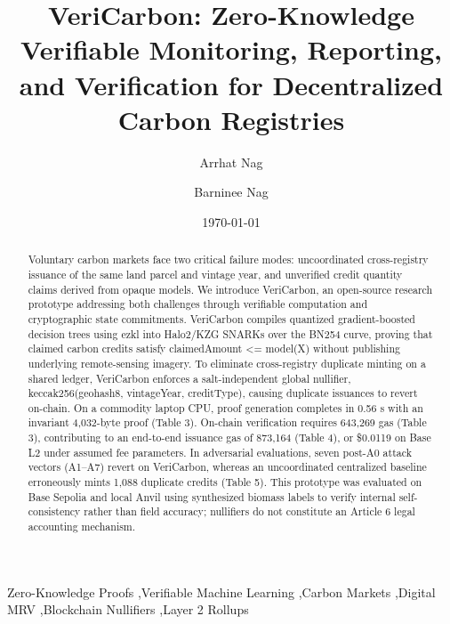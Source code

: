 \documentclass[preprint,12pt]{elsarticle}
\date{\today}
\begin{document}
\begin{frontmatter}

\title{VeriCarbon: Zero-Knowledge Verifiable Monitoring, Reporting, and Verification for Decentralized Carbon Registries}

\author[inst1]{Arrhat Nag}

\author[inst2]{Barninee Nag}

\begin{abstract}
Voluntary carbon markets face two critical failure modes: uncoordinated cross-registry issuance of the same land parcel and vintage year, and unverified credit quantity claims derived from opaque models. We introduce VeriCarbon, an open-source research prototype addressing both challenges through verifiable computation and cryptographic state commitments. VeriCarbon compiles quantized gradient-boosted decision trees using ezkl into Halo2/KZG SNARKs over the BN254 curve, proving that claimed carbon credits satisfy claimedAmount <= model(X) without publishing underlying remote-sensing imagery. To eliminate cross-registry duplicate minting on a shared ledger, VeriCarbon enforces a salt-independent global nullifier, keccak256(geohash8, vintageYear, creditType), causing duplicate issuances to revert on-chain. On a commodity laptop CPU, proof generation completes in 0.56 s with an invariant 4,032-byte proof (Table 3). On-chain verification requires 643,269 gas (Table 3), contributing to an end-to-end issuance gas of 873,164 (Table 4), or \$0.0119 on Base L2 under assumed fee parameters. In adversarial evaluations, seven post-A0 attack vectors (A1–A7) revert on VeriCarbon, whereas an uncoordinated centralized baseline erroneously mints 1,088 duplicate credits (Table 5). This prototype was evaluated on Base Sepolia and local Anvil using synthesized biomass labels to verify internal self-consistency rather than field accuracy; nullifiers do not constitute an Article 6 legal accounting mechanism.
\end{abstract}

\begin{keyword}
Zero-Knowledge Proofs \sep Verifiable Machine Learning \sep Carbon Markets \sep Digital MRV \sep Blockchain Nullifiers \sep Layer 2 Rollups
\end{keyword}

\end{frontmatter}
\end{document}
